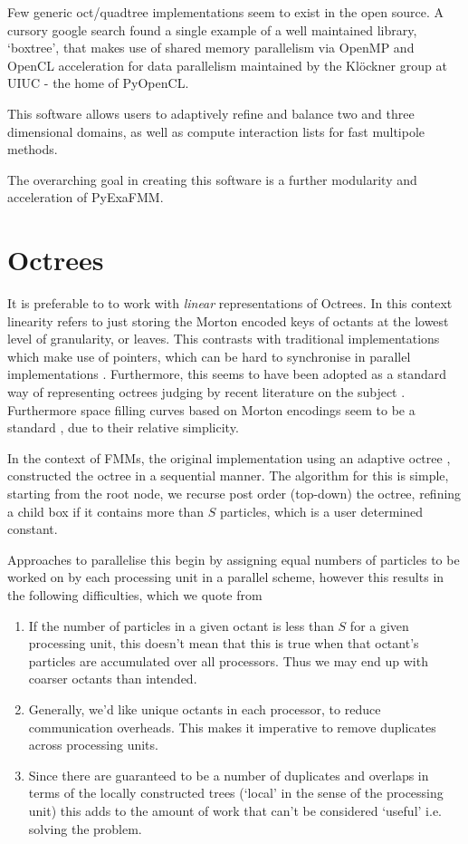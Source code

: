 \documentclass[12pt, a4, twoside]{article}
\begin{document}
Few generic oct/quadtree implementations seem to exist in the open source. A cursory google search found a single example of a well maintained library, `boxtree', that makes use of shared memory parallelism via OpenMP and OpenCL acceleration for data parallelism maintained by the Klöckner group at UIUC \cite{boxtree} - the home of PyOpenCL.

This software allows users to adaptively refine and balance two and three dimensional domains, as well as compute interaction lists for fast multipole methods.

The overarching goal in creating this software is a further modularity and acceleration of PyExaFMM.

\section*{Octrees}

It is preferable to to work with \textit{linear} representations of Octrees. In this context linearity refers to just storing the Morton encoded keys of octants at the lowest level of granularity, or leaves. This contrasts with traditional implementations which make use of pointers, which can be hard to synchronise in parallel implementations \cite{Sundar:2008:SIAM}. Furthermore, this seems to have been adopted as a standard way of representing octrees judging by recent literature on the subject \cite{Malhotra,Lashuk:2012:ACM}. Furthermore space filling curves based on Morton encodings seem to be a standard \cite{Malhotra,Sundar:2008:SIAM}, due to their relative simplicity.

In the context of FMMs, the original implementation using an adaptive octree \cite{Carrier1988}, constructed the octree in a sequential manner. The algorithm for this is simple, starting from the root node, we recurse post order (top-down) the octree, refining a child box if it contains more than $S$ particles, which is a user determined constant.

Approaches to parallelise this begin by assigning equal numbers of particles to be worked on by each processing unit in a parallel scheme, however this results in the following difficulties, which we quote from \cite{Sundar:2008:SIAM}

\begin{enumerate}
    \item If the number of particles in a given octant is less than $S$ for a given processing unit, this doesn't mean that this is true when that octant's particles are accumulated over all processors. Thus we may end up with coarser octants than intended.
    \item Generally, we'd like unique octants in each processor, to reduce communication overheads. This makes it imperative to remove duplicates across processing units.
    \item Since there are guaranteed to be a number of duplicates and overlaps in terms of the locally constructed trees (`local' in the sense of the processing unit) this adds to the amount of work that can't be considered `useful' i.e. solving the problem.
\end{enumerate}
\end{document}
